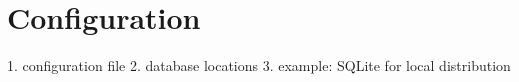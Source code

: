 \chapter{Configuration}

1. configuration file
2. database locations
3. example: SQLite for local distribution

